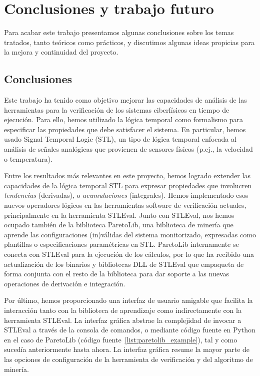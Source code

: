 \chapter{Conclusiones y trabajo futuro}
\label{cha:concl}
Para acabar este trabajo presentamos algunas conclusiones sobre los temas tratados, tanto teóricos como prácticos, y discutimos algunas ideas propicias para la mejora y continuidad del proyecto.

\section{Conclusiones}
Este trabajo ha tenido como objetivo mejorar las capacidades de análisis de las herramientas para la verificación de los sistemas ciberfísicos en tiempo de ejecución. Para ello, hemos utilizado la lógica temporal como formalismo para especificar las propiedades que debe satisfacer el sistema. En particular, hemos usado Signal Temporal Logic (STL), un tipo de lógica temporal enfocada al análisis de señales analógicas que provienen de sensores físicos (p.ej., la velocidad o temperatura).

Entre los resultados más relevantes en este proyecto, hemos logrado extender las capacidades de la lógica temporal STL para expresar propiedades que involucren \textit{tendencias} (derivadas), o \textit{acumulaciones} (integrales). Hemos implementado esos nuevos operadores lógicos en las herramientas software de verificación actuales, principalmente en la herramienta STLEval. Junto con STLEval, nos hemos ocupado también de la biblioteca ParetoLib, una biblioteca de minería que aprende las configuraciones (in)válidas del sistema monitorizado, expresadas como plantillas o especificaciones paramétricas en STL. ParetoLib internamente se conecta con STLEval para la ejecución de los cálculos, por lo que ha recibido una actualización de los binarios y bibliotecas DLL de STLEval que empaqueta de forma conjunta con el resto de la biblioteca para dar soporte a las nuevas operaciones de derivación e integración.

Por último, hemos proporcionado una interfaz de usuario amigable que facilita la interacción tanto con la biblioteca de aprendizaje como indirectamente con la herramienta STLEval. La interfaz gráfica abstrae la complejidad de invocar a STLEval a través de la consola de comandos, o mediante código fuente en Python en el caso de ParetoLib (código fuente~\ref{list:paretolib_example}), tal y como sucedía anteriormente hasta ahora. La interfaz gráfica resume la mayor parte de las opciones de configuración de la herramienta de verificación y del algoritmo de minería.


